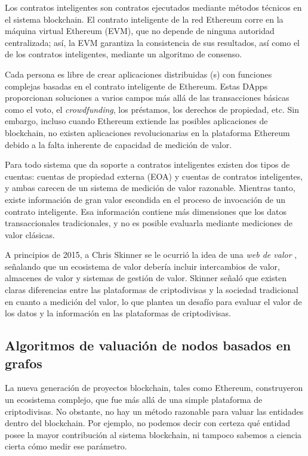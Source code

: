 Los contratos inteligentes son contratos ejecutados mediante métodos técnicos en el sistema blockchain. El contrato inteligente de la red Ethereum corre en la máquina virtual Ethereum (EVM), que no depende de ninguna autoridad centralizada; así, la EVM garantiza la consistencia de sus resultados, así como el de los contratos inteligentes, mediante un algoritmo de consenso.

Cada persona es libre de crear aplicaciones distribuidas ({\dapp}s) con funciones complejas basadas en el contrato inteligente de Ethereum. Estas DApps proporcionan soluciones a varios campos más allá de las transacciones básicas como el voto, el \textit{crowdfunding}, los préstamos, los derechos de propiedad, etc. Sin embargo, incluso cuando Ethereum extiende las posibles aplicaciones de blockchain, no existen aplicaciones revolucionarias en la plataforma Ethereum debido a la falta inherente de capacidad de medición de valor.

Para todo sistema que da soporte a contratos inteligentes existen dos tipos de cuentas: cuentas de propiedad externa (EOA) y cuentas de contratos inteligentes, y ambas carecen de un sistema de medición de valor razonable. Mientras tanto, existe información de gran valor escondida en el proceso de invocación de un contrato inteligente. Esa información contiene más dimensiones que los datos transaccionales tradicionales, y no es posible evaluarla mediante mediciones de valor clásicas.

A principios de 2015, a Chris Skinner se le ocurrió la idea de una \emph{web de valor} \cite{ChrisSkinner}, señalando que un ecosistema de valor debería incluir intercambios de valor, almacenes de valor y sistemas de gestión de valor. Skinner señaló que existen claras diferencias entre las plataformas de criptodivisas y la sociedad tradicional en cuanto a medición del valor, lo que plantea un desafío para evaluar el valor de los datos y la información en las plataformas de criptodivisas.

\subsection{Algoritmos de valuación de nodos basados en grafos}
La nueva generación de proyectos blockchain, tales como Ethereum, construyeron un ecosistema complejo, que fue más allá de una simple plataforma de criptodivisas. No obstante, no hay un método razonable para valuar las entidades dentro del blockchain. Por ejemplo, no podemos decir con certeza qué entidad posee la mayor contribución al sistema blockchain, ni tampoco sabemos a ciencia cierta cómo medir ese parámetro.


